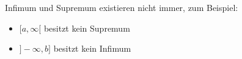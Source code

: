 Infimum und Supremum existieren nicht immer, zum Beispiel:

\begin{itemize}
    \item $[a, \infty[$ besitzt kein Supremum
    \item $]-\infty, b]$ besitzt kein Infimum
\end{itemize}
